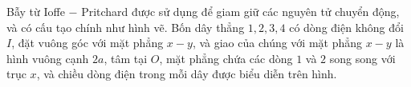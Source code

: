 \begin{vd}
Bẫy từ Ioffe $-$ Pritchard được sử dụng để giam giữ các nguyên tử chuyển động, và có cấu tạo chính như hình vẽ. Bốn dây thẳng $1,2,3,4$ có dòng điện không đổi $I$, đặt vuông góc với mặt phẳng $x-y$, và giao của chúng với mặt phẳng $x-y$ là hình vuông cạnh $2 a$, tâm tại ${O}$, mặt phẳng chứa các dòng $1$ và $2$ song song với trục $x$, và chiều dòng điện trong mỗi dây được biểu diễn trên hình.
\begin{center}


\begin{tikzpicture}[x=0.75pt,y=0.75pt,yscale=-1,xscale=1]


\end{tikzpicture}
\end{center}
\end{vd}
